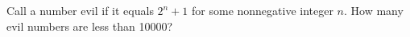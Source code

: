 Call a number evil if it equals $2^n+1$ for some nonnegative integer $n$. How many evil numbers are less than 10000?
